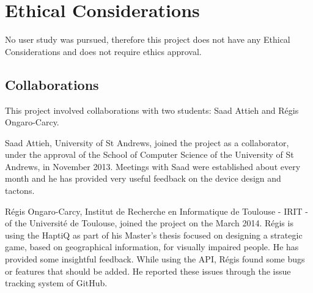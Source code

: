 \chapter{Ethical Considerations}

No user study was pursued, therefore this project does not have any Ethical Considerations and does not require ethics approval.\newline \par

\section{Collaborations}
\label{sec:collaborators}
This project involved collaborations with two students: Saad Attieh and Régis Ongaro-Carcy.  

Saad Attieh, University of St Andrews, joined the project as a collaborator, under the approval of the School of Computer Science of the University of St Andrews, in November 2013. Meetings with Saad were established about every month and he has provided very useful feedback on the device design and tactons. 

Régis Ongaro-Carcy, Institut de Recherche en Informatique de Toulouse - IRIT - of the Université de Toulouse, joined the project on the  March 2014. Régis is using the HaptiQ as part of his Master's thesis focused on designing a strategic game, based on geographical information, for visually impaired people. He has provided some insightful feedback. While using the API, Régis found some bugs or features that should be added. He reported these issues through the issue tracking system of GitHub.